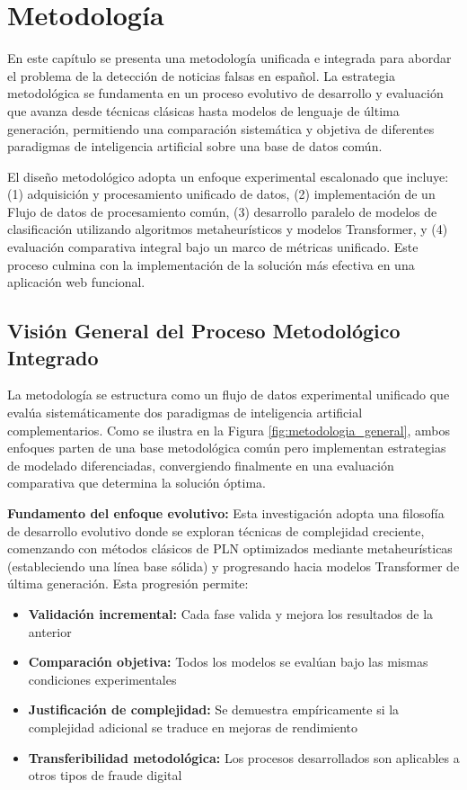 \chapter{Metodología \label{cap:Metodologia}}

En este capítulo se presenta una metodología unificada e integrada para abordar el problema de la detección de noticias falsas en español. La estrategia metodológica se fundamenta en un proceso evolutivo de desarrollo y evaluación que avanza desde técnicas clásicas hasta modelos de lenguaje de última generación, permitiendo una comparación sistemática y objetiva de diferentes paradigmas de inteligencia artificial sobre una base de datos común.

El diseño metodológico adopta un enfoque experimental escalonado que incluye: (1) adquisición y procesamiento unificado de datos, (2) implementación de un Flujo de datos de procesamiento común, (3) desarrollo paralelo de modelos de clasificación utilizando algoritmos metaheurísticos y modelos Transformer, y (4) evaluación comparativa integral bajo un marco de métricas unificado. Este proceso culmina con la implementación de la solución más efectiva en una aplicación web funcional.

\section{Visión General del Proceso Metodológico Integrado}

La metodología se estructura como un flujo de datos experimental unificado que evalúa sistemáticamente dos paradigmas de inteligencia artificial complementarios. Como se ilustra en la Figura \ref{fig:metodologia_general}, ambos enfoques parten de una base metodológica común pero implementan estrategias de modelado diferenciadas, convergiendo finalmente en una evaluación comparativa que determina la solución óptima.

\textbf{Fundamento del enfoque evolutivo:} Esta investigación adopta una filosofía de desarrollo evolutivo donde se exploran técnicas de complejidad creciente, comenzando con métodos clásicos de PLN optimizados mediante metaheurísticas (estableciendo una línea base sólida) y progresando hacia modelos Transformer de última generación. Esta progresión permite:

\begin{itemize}
    \item \textbf{Validación incremental:} Cada fase valida y mejora los resultados de la anterior
    \item \textbf{Comparación objetiva:} Todos los modelos se evalúan bajo las mismas condiciones experimentales
    \item \textbf{Justificación de complejidad:} Se demuestra empíricamente si la complejidad adicional se traduce en mejoras de rendimiento
    \item \textbf{Transferibilidad metodológica:} Los procesos desarrollados son aplicables a otros tipos de fraude digital
\end{itemize}


